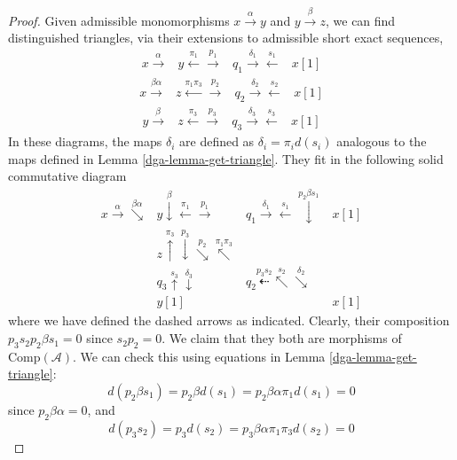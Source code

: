 \begin{proof}

Given admissible monomorphisms $x\xrightarrow{\alpha} y$ and
$y\xrightarrow{\beta}z$, we can find distinguished triangles,
via their extensions to admissible short exact sequences,
$$
\begin{array}{cccc}x\overset{\alpha}{\longrightarrow} & y\overset{\pi_1}{\longleftarrow}\overset{p_1}{\longrightarrow} & q_1 \overset{\delta_1}{\longrightarrow}\overset{s_1}{\longleftarrow} & x[1]\end{array}
$$
$$
\begin{array}{cccc}x\overset{\beta\alpha}{\longrightarrow} & z\overset{\pi_1\pi_3}{\longleftarrow}\overset{p_2}{\longrightarrow} & q_2 \overset{\delta_2}{\longrightarrow}\overset{s_2}{\longleftarrow} & x[1]\end{array}
$$
$$
\begin{array}{cccc}y\overset{\beta}{\longrightarrow} & z\overset{\pi_3}{\longleftarrow}\overset{p_3}{\longrightarrow} & q_3 \overset{\delta_3}{\longrightarrow}\overset{s_3}{\longleftarrow} & x[1]\end{array}
$$
In these diagrams, the maps $\delta_i$ are defined as
$\delta_i = \pi_i d(s_i)$ analogous to the maps defined in
Lemma \ref{dga-lemma-get-triangle}.
They fit in the following solid commutative diagram
$$
\begin{array}{cccc}x\overset{\alpha}{\longrightarrow}\overset{\beta\alpha}{\searrow} & y\overset{\beta}{\downarrow}\overset{\pi_1}{\longleftarrow}\overset{p_1}{\longrightarrow} & q_1 \overset{\delta_1}{\longrightarrow}\overset{s_1}{\longleftarrow}\overset{p_2\beta s_1}{\downarrow} & x[1] \\  & z \overset{\pi_3}{\uparrow}\overset{p_3}{\downarrow}\overset{p_2}{\searrow}\overset{\pi_1\pi_3}{\nwarrow} &  &  \\  & q_3\overset{s_3}{\uparrow}\overset{\delta_3}{\downarrow} & q_2 \overset{p_3s_2}{\dashleftarrow}\overset{s_2}{\nwarrow}\overset{\delta_2}{\searrow} &  \\  & y[1] &  & x[1]\end{array}
$$
where we have defined the dashed arrows as indicated.
Clearly, their composition $p_3s_2p_2\beta s_1 = 0$
since $s_2p_2 = 0$. We claim that they both are morphisms of
$\text{Comp}(\mathcal{A})$. We can check this using equations in
Lemma \ref{dga-lemma-get-triangle}:
$$
d(p_2\beta s_1) = p_2\beta d(s_1) = p_2\beta\alpha\pi_1 d(s_1) = 0
$$
since $p_2\beta\alpha = 0$, and
$$
d(p_3s_2) = p_3d(s_2) = p_3\beta\alpha\pi_1\pi_3 d(s_2) = 0
$$
\end{proof}
